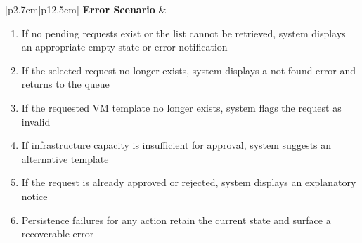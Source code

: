 \begin{table}[H]
\begin{tabular}{|p{2.7cm}|p{12.5cm}|}
        \hline
        \textbf{Error Scenario} & \begin{minipage}[t]{\linewidth}
            \begin{enumerate}[topsep=0pt,itemsep=1pt,parsep=0pt,partopsep=0pt]
                \item If no pending requests exist or the list cannot be retrieved, system displays an appropriate empty state or error notification
                \item If the selected request no longer exists, system displays a not-found error and returns to the queue
                \item If the requested VM template no longer exists, system flags the request as invalid
                \item If infrastructure capacity is insufficient for approval, system suggests an alternative template
                \item If the request is already approved or rejected, system displays an explanatory notice
                \item Persistence failures for any action retain the current state and surface a recoverable error
            \end{enumerate}
        \end{minipage} \\
        \hline
    \end{tabular}
    \label{tab:admin-vm-assignment-queue}
\end{table}



